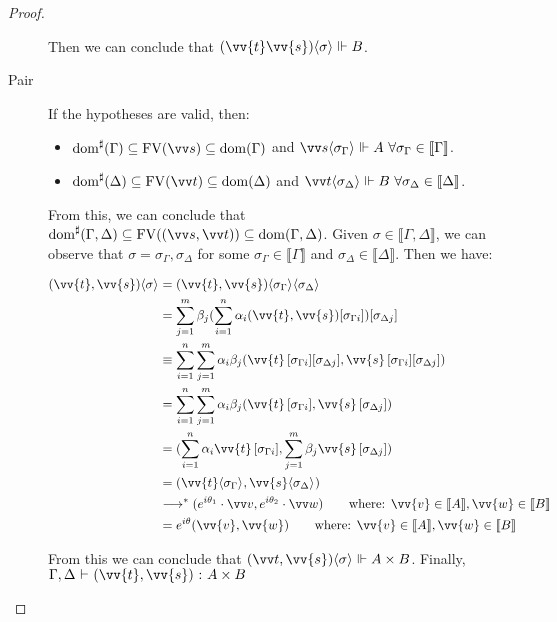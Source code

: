 \documentclass[runningheads,orivec,envcountsame,envcountsect]{llncs}
\newcommand\lra{\longrightarrow}
\newcommand\ansubst[2]{\ensuremath{\langle #1 \rangle_{#2}}}
\newcommand\dom[1]{\mathrm{dom}(#1)}
\newcommand\sdom[1]{\mathrm{dom}^{\sharp}(#1)}
\newcommand\FV[1]{\mathrm{FV}(#1)}
\def\Pair#1#2{(#1,#2)} %
\def\eval{\lra^*}
\def\sem#1{\llbracket#1\rrbracket}
\def\TYP#1#2#3{#1~{\vdash}~#2~{:}~#3}
\def\real{\Vdash}
\begin{document}
\begin{proof}
\begin{description}
    Then we can conclude that $(\vv{t}\vv{s})\ansubst{\sigma}{}\real B$.
    
    \item[Pair] If the hypotheses are valid, then:

    \begin{itemize}
        \item $\sdom{\Gamma}\subseteq \FV{\vv s}\subseteq \dom{\Gamma}$ and $\vv s \ansubst{\sigma_\Gamma}{}\Vdash A\ \forall \sigma_\Gamma\in\sem{\Gamma}$.
        \item $\sdom{\Delta}\subseteq \FV{\vv t}\subseteq \dom{\Delta}$ and $\vv t\ansubst{\sigma_\Delta}{}\Vdash B\ \forall \sigma_\Delta\in\sem{\Delta}$.
    \end{itemize}
    
    From this, we can conclude that $\sdom{\Gamma,\Delta}\subseteq \FV{(\vv s, \vv t)}\subseteq \dom{\Gamma,\Delta}$. Given $\sigma\in\sem{\Gamma,\Delta}$, we can observe that $\sigma=\sigma_\Gamma,\sigma_\Delta$ for some  $\sigma_\Gamma\in\sem{\Gamma}$ and $\sigma_\Delta\in\sem{\Delta}$. Then we have:

    \begin{align*}
        \Pair{\vv{t}}{\vv{s}}\ansubst{\sigma}{} &= \Pair{\vv{t}}{\vv{s}}\ansubst{\sigma_\Gamma}{}\ansubst{\sigma_\Delta}{}\\
        &=\sum_{j=1}^{m} \beta_j (\sum_{i=1}^{n} \alpha_i \Pair{\vv{t}}{\vv{s}}[\sigma_{\Gamma i}])[\sigma_{\Delta j}]\\
        &\equiv\sum_{i=1}^{n}\sum_{j=1}^{m} \alpha_i \beta_j \Pair{\vv{t}\,[\sigma_{\Gamma i}][\sigma_{\Delta j}]}{\vv{s}\,[\sigma_{\Gamma i}][\sigma_{\Delta j}]}\\
        &=\sum_{i=1}^{n}\sum_{j=1}^{m} \alpha_i \beta_j \Pair{\vv{t}\,[\sigma_{\Gamma i}]}{\vv{s}\,[\sigma_{\Delta j}]}\\
        &=\Pair{\sum_{i=1}^{n} \alpha_i \vv{t}\, [\sigma_{\Gamma i}]}{\sum_{j=1}^{m} \beta_j \vv{s}\, [\sigma_{\Delta j}]}\\
        &=\Pair{\vv{t}\ansubst{\sigma_\Gamma}{}}{\vv{s}\ansubst{\sigma_\Delta}{}}\\
        &\eval \Pair{e^{i\theta_1}\cdot\vv v}{e^{i\theta_2}\cdot\vv w}\qquad\text{where: }\vv{v}\in\sem{A}, \vv{w}\in\sem{B}\\
        &= e^{i\theta} \Pair{\vv{v}}{\vv{w}}\qquad\text{where: }\vv{v}\in\sem{A},\vv{w}\in\sem{B}
    \end{align*}
    
    From this we can conclude that $\Pair{\vv t}{\vv{s}}\ansubst{\sigma}{}\real A\times B$. Finally, $\TYP{\Gamma,\Delta}{\Pair{\vv{t}}{\vv{s}}}{A\times B}$
    

\end{description}
\end{proof}
\end{document}

